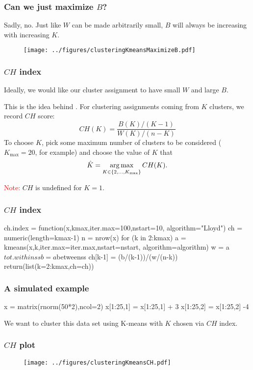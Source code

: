 \documentclass{beamer}
\begin{document}
\begin{frame}[fragile]
\frametitle{Can we just maximize $B$?}
Sadly, no.  Just like $W$ can be made arbitrarily small, $B$ will always be increasing
with increasing $K$.
\begin{figure}[h!]
  \centering
  \texttt{[image: ../figures/clusteringKmeansMaximizeB.pdf]}  
\end{figure}
\end{frame}

\begin{frame}[fragile]
\frametitle{$CH$ index}
Ideally, we would like our cluster assignment to  have small $W$ and large $B$.
\vsp

This is the idea behind .  For clustering assignments coming from $K$
clusters, we record $CH$ score:
\[
CH(K) = \frac{B(K)/(K-1)}{W(K)/(n-K)} 
\]
To choose $K$, pick some maximum number of clusters to be considered ($K_{\max} = 20$,
for example)  and choose the value of $K$ that
\[
\hat K = \operatorname*{arg\,max}_{K \in \{ 2,\ldots, K_{\max} \}} CH(K).
\]

\textcolor{red}{Note:} $CH$ is undefined for $K =1$.

\vsp
{}
\end{frame}

\begin{frame}[fragile]
\frametitle{$CH$ index}
\begin{blockcode}
ch.index = function(x,kmax,iter.max=100,nstart=10,
                      algorithm="Lloyd")
{
  ch = numeric(length=kmax-1)
  n = nrow(x)
  for (k in 2:kmax) {
    a = kmeans(x,k,iter.max=iter.max,nstart=nstart,
              algorithm=algorithm)
    w = a$tot.withinss
    b = a$betweenss
   ch[k-1] = (b/(k-1))/(w/(n-k))
  }
  return(list(k=2:kmax,ch=ch))
}
\end{blockcode}
\end{frame}

\begin{frame}[fragile]
\frametitle{A simulated example}
\begin{blockcode}
x = matrix(rnorm(50*2),ncol=2)
x[1:25,1] = x[1:25,1] + 3
x[1:25,2] = x[1:25,2] -4
\end{blockcode}
\vsp

We want to cluster this data set using K-means with $K$ chosen via $CH$ index.
\end{frame}

\begin{frame}[fragile]
\frametitle{$CH$ plot}
\begin{figure}[h!]
  \centering
  \texttt{[image: ../figures/clusteringKmeansCH.pdf]}  
\end{figure}
\end{frame}
\end{document}
